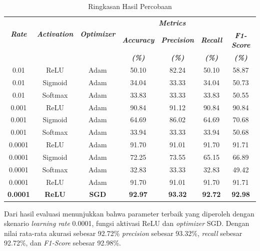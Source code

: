 \begin{table}[H]
\begin{table}[H]
    \centering
    \caption{Ringkasan Hasil Percobaan}
    \begin{tabular}{ccccccc}
        \toprule
        \multirow{2}{*}{\textbf{\textit{Rate}}} & \multirow{2}{*}{\textbf{\textit{Activation}}} & \multirow{2}{*}{\textbf{\textit{Optimizer}}} & \multicolumn{3}{c}{\textbf{\textit{Metrics}}} \\
        \cmidrule{4-7}
        & & & \textbf{\textit{Accuracy}} & \textbf{\textit{Precision}} & \textbf{\textit{Recall}} & \textbf{\textit{F1-Score}} \\
        & & & \textbf{\textit{(\%)}} & \textbf{\textit{(\%)}} & \textbf{\textit{(\%)}} & \textbf{\textit{(\%)}} \\
        \midrule
        0.01 & ReLU   & Adam  & 50.10 & 82.24 & 50.10 & 58.87\\
        0.01 & Sigmoid & Adam  & 34.04 & 33.33 & 34.04 & 50.73 \\
        0.01 & Softmax & Adam  & 33.83 & 33.33 & 33.83 & 50.55\\
        \midrule
        0.001 & ReLU    & Adam  & 90.84 & 91.12 & 90.84 & 90.84\\
        0.001 & Sigmoid & Adam  & 64.69 & 86.02 & 64.69 & 70.68 \\
        0.001 & Softmax & Adam  & 33.94 & 33.33 & 33.94 & 50.68\\
        \midrule
        0.0001 & ReLU & Adam  & 91.70 & 91.01 & 91.70 & 91.71\\
        0.0001 & Sigmoid & Adam  & 72.25 & 73.55 & 65.15 & 66.89\\
        0.0001 & Softmax & Adam & 32.83 & 33.33 & 32.83 & 49.42\\
        \midrule
        0.0001 & ReLU & Adam  & 91.70 & 91.01 & 91.70 & 91.71\\
        \textbf{0.0001} & \textbf{ReLU} & \textbf{SGD} & \textbf{92.97} & \textbf{93.32} & \textbf{92.72} & \textbf{92.98}\\
        \bottomrule
    \end{tabular}
    \label{Ringkasan Hasil Percobaan}
\end{table}


    Dari hasil evaluasi menunjukkan bahwa parameter terbaik yang diperoleh dengan skenario \textit{learning rate} 0.0001, fungsi aktivasi ReLU dan \textit{optimizer} SGD. Dengan nilai rata-rata akurasi sebesar 92.72\% \textit{precision} sebesar 93.32\%, \textit{recall} sebesar 92.72\%, dan \textit{F1-Score} sebesar 92.98\%.



\end{table}
